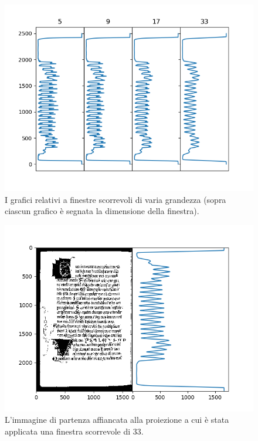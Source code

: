 \begin{figure}
    \includegraphics[width=\textwidth]{figures/all-smooth.png}
    \caption{I grafici relativi a finestre scorrevoli di varia grandezza (sopra ciascun grafico \`e segnata la dimensione della finestra).}
    \label{fig:all_smooth}
\end{figure}

\begin{figure}
    \includegraphics[width=\textwidth]{figures/horizontal-projection-smoothed.png}
    \caption{L'immagine di partenza affiancata alla proiezione a cui \`e stata applicata una finestra scorrevole di 33.}
    \label{fig:horiz_proj_smooth}
\end{figure}

